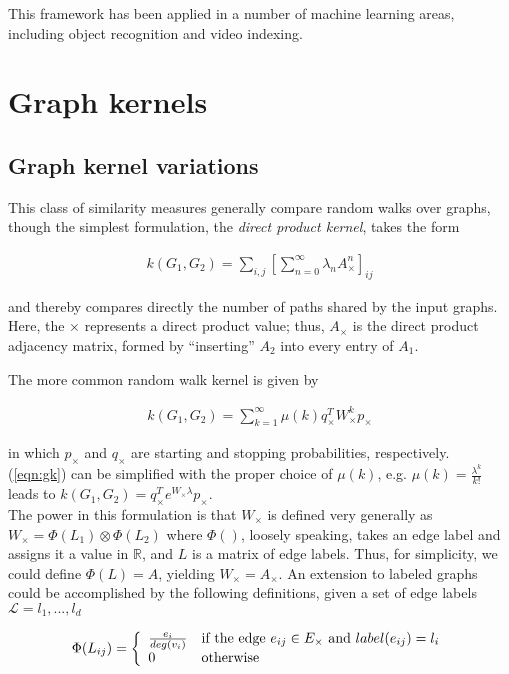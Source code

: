 \documentclass[11pt]{article}
\begin{document}
This framework has been applied in a number of machine learning areas, including object recognition and video indexing. %

\section{Graph kernels}
\subsection{Graph kernel variations}
This class of similarity measures generally compare random walks over graphs, though the simplest formulation, the \textit{direct product kernel}, takes the form

\begin{align}
k(G_1, G_2) = \sum\limits_{i,j}[\sum\limits_{n=0}^{\infty}\lambda_n A_\times^n]_{ij}
\label{eqn:dpk}
\end{align}

and thereby compares directly the number of paths shared by the input graphs. Here, the $\times$ represents a direct product value; thus, $A_\times$ is the direct product adjacency matrix, formed by ``inserting'' $A_2$ into every entry of $A_1$. 

The more common random walk kernel is given by 

\begin{align}
k(G_1, G_2) = \sum\limits_{k=1}^{\infty}\mu(k) q_\times^T W_\times^k p_\times
\label{eqn:gk}
\end{align}


in which $p_\times$ and $q_\times$ are starting and stopping probabilities, respectively. (\ref{eqn:gk}) can be simplified with the proper choice of $\mu(k)$, e.g. $\mu(k) = \frac{\lambda^k}{k!}$ leads to $k(G_1, G_2) = q_\times^T e^{W_\times \lambda} p_\times$. \\
The power in this formulation is that $W_\times$ is defined very generally as $W_\times = \Phi(L_1)\otimes\Phi(L_2)$ where $\Phi()$, loosely speaking, takes an edge label and assigns it a value in $\mathbb{R}$, and $L$ is a matrix of edge labels. Thus, for simplicity, we could define $\Phi(L) = A$, yielding $W_\times = A_\times$. An extension to labeled graphs could be accomplished by the following definitions, given a set of edge labels $\mathcal{L} = {l_1,...,l_d}$

\begin{equation}
\Phi(L_{ij}) = \left \{
\begin{array}{l l}
\frac{e_i}{deg(v_i)} & \text{if the edge $e_{ij} \in E_\times$ and $label(e_{ij}) = l_i$} \\
0 & \text{otherwise}
\end{array}
\right.
\label{eqn:lgk} 
\end{equation}
\end{document}
